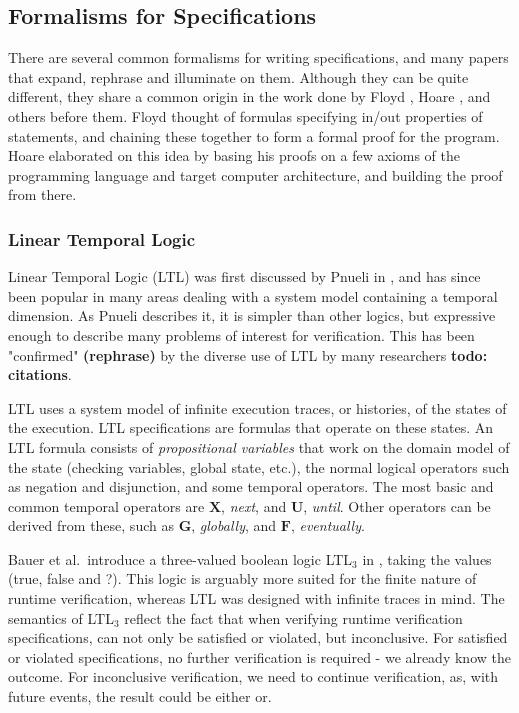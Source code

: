 \documentclass[a4paper,11pt]{kth-mag}
\newcommand{\todo}[1]{\textbf{todo: #1}}
\newcommand{\rephrase}{\textbf{(rephrase)} }
\begin{document}
\subsection{Formalisms for Specifications}

There are several common formalisms for writing specifications, and many papers
that expand, rephrase and illuminate on them. Although they can be quite
different, they share a common origin in the work done by Floyd \cite{floyd67},
Hoare \cite{hoare69}, and others before them.  Floyd thought of formulas
specifying in/out properties of statements, and chaining these together to form
a formal proof for the program. Hoare elaborated on this idea by basing his
proofs on a few axioms of the programming language and target computer
architecture, and building the proof from there.

\subsubsection{Linear Temporal Logic}

Linear Temporal Logic (LTL) was first discussed by Pnueli in \cite{pnueli77},
and has since been popular in many areas dealing with a system model containing
a temporal dimension. As Pnueli describes it, it is simpler than other logics,
but expressive enough to describe many problems of interest for verification.
This has been "confirmed" \rephrase by the diverse use of LTL by many
researchers \todo{citations}.

LTL uses a system model of infinite execution traces, or histories, of the
states of the execution. LTL specifications are formulas that operate on these
states. An LTL formula consists of \textit{propositional variables} that work
on the domain model of the state (checking variables, global state, etc.), the
normal logical operators such as negation and disjunction, and some temporal
operators. The most basic and common temporal operators are $\boldsymbol{X}$,
\textit{next}, and $\boldsymbol{U}$, \textit{until}. Other operators can be
derived from these, such as $\boldsymbol{G}$, \textit{globally}, and
$\boldsymbol{F}$, \textit{eventually}.

Bauer et al.\ introduce a three-valued boolean logic LTL$_3$ in
\cite{bauer06monitoring}, taking the values (true, false and ?). This logic is
arguably more suited for the finite nature of runtime verification, whereas LTL
was designed with infinite traces in mind. The semantics of LTL$_3$ reflect the
fact that when verifying runtime verification specifications, can not only
be satisfied or violated, but inconclusive. For satisfied or violated
specifications, no further verification is required - we already know the
outcome. For inconclusive verification, we need to continue verification, as,
with future events, the result could be either or.
\end{document}
